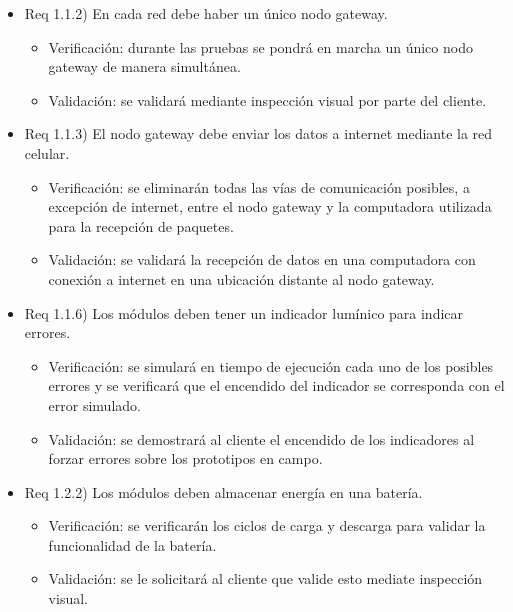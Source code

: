 \documentclass[
11pt, %
codirector, %
]{charter}
\begin{document}
\begin{itemize} 

\item Req 1.1.2) En cada red debe haber un único nodo gateway.

\begin{itemize}
	\item Verificación: durante las pruebas se pondrá en marcha un único nodo gateway de manera simultánea.
	\item Validación: se validará mediante inspección visual por parte del cliente.
\end{itemize}


\item Req 1.1.3) El nodo gateway debe enviar los datos a internet mediante la red celular.

\begin{itemize}
	\item Verificación: se eliminarán todas las vías de comunicación posibles, a excepción de internet, entre el nodo gateway y la computadora utilizada para la recepción de paquetes.
	\item Validación: se validará la recepción de datos en una computadora con conexión a internet en una ubicación distante al nodo gateway.
\end{itemize}

\item Req 1.1.6) Los módulos deben tener un indicador lumínico para indicar errores.

\begin{itemize}
	\item Verificación: se simulará en tiempo de ejecución cada uno de los posibles errores y se verificará que el encendido del indicador se corresponda con el error simulado.
	\item Validación: se demostrará al cliente el encendido de los indicadores al forzar errores sobre los prototipos en campo.
\end{itemize}

\item Req 1.2.2) Los módulos deben almacenar energía en una batería.

\begin{itemize}
	\item Verificación: se verificarán los ciclos de carga y descarga para validar la funcionalidad de la batería.
	\item Validación: se le solicitará al cliente que valide esto mediate inspección visual.
\end{itemize}


\end{itemize}
\end{document}
